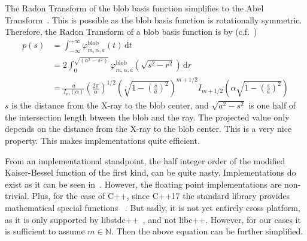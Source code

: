The Radon Transform  of the blob basis function simplifies to the Abel
Transform~\cite{buzug_computed_2008}. This is possible as the blob basis function is rotationally
symmetric. Therefore, the Radon Transform of a blob basis function is by
(c.f.~\cite{lewitt_multidimensional_1990,lewitt_alternatives_1992})
\begin{align}\label{eq:radon_blob_basis}
	p(s) & = \int_{-\infty}^{+\infty} \varphi^{\text{blob}}_{m, \alpha, a}\left(t\right) \, \mathrm{d} t                                                                                                       \\
	     & = 2 \int_0^{\sqrt{(a^2-s^2)}} \varphi^{\text{blob}}_{m, \alpha, a}\left(\sqrt{s^2 - r^2}\right) \, \mathrm{d} r                                                                                     \\
	     & = \frac{a}{I_m(\alpha)} \left( \frac{2\pi}{\alpha}\right)^{1/2} \left( \sqrt{1 - \left(\frac{s}{a}\right)^2} \right)^{m + 1/2} I_{m+1/2}\left( \alpha \sqrt{1 - \left(\frac{s}{a}\right)^2} \right)
\end{align}
\(s\) is the distance from the X-ray to the blob center, and \(\sqrt{a^2 - s^2}\) is one half of the
intersection length btween the blob and the ray. The projected value only depends on the distance
from the X-ray to the blob center. This is a very nice property. This makes implementations quite
efficient.


From an implementational standpoint, the half integer order of the modified Kaiser-Bessel function
of the first kind, can be quite nasty. Implementations do exist as it can be seen
in~\cite{temme_numerical_1975}. However, the floating point implementations are non-trivial. Plus,
for the case of C++, since C++17 the standard library provides mathematical special functions
~\cite{noauthor_c_nodate, noauthor_stdcyl_bessel_i_nodate}. But sadly, it is not yet entirely
cross platform, as it is only supported by libstdc++~\cite{noauthor_libstdc_nodate-1}, and not
libc++. However, for our cases it is sufficient to assume \(m \in \mathbb{N}\). Then the above
equation can be further simplified.

